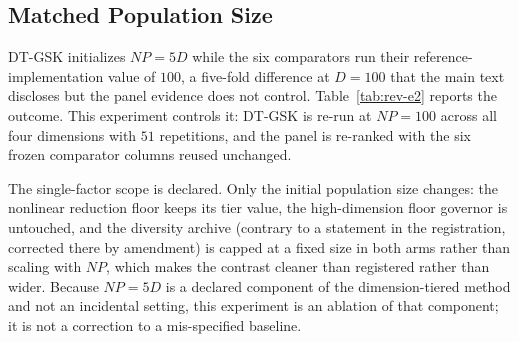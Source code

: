 \documentclass[algorithms,article,submit,moreauthors,pdftex]{Definitions/mdpi}
\newcommand{\dtgsk}{DT-GSK}
\begin{document}
\subsection{Matched Population Size}\label{sec:supp:rev:np}

\dtgsk{} initializes $NP = 5D$ while the six comparators run their
reference-implementation value of $100$, a five-fold difference at $D = 100$
that the main text discloses but the panel evidence does not control.
Table~\ref{tab:rev-e2} reports the outcome.  This experiment
controls it: \dtgsk{} is re-run at $NP = 100$ across all four dimensions with
$51$ repetitions, and the panel is re-ranked with the six frozen comparator
columns reused unchanged.

The single-factor scope is declared.  Only the initial population size changes:
the nonlinear reduction floor keeps its tier value, the high-dimension floor
governor is untouched, and the diversity archive (contrary to a statement in the
registration, corrected there by amendment) is capped at a fixed size in both
arms rather than scaling with $NP$, which makes the contrast cleaner than
registered rather than wider.  Because $NP = 5D$ is a declared component of the
dimension-tiered method and not an incidental setting, this experiment is an
ablation of that component; it is not a correction to a mis-specified baseline.

\begin{table}[H]
\caption{\dtgsk{} at the comparators' population value.  Mean ranks and ordinal
positions are computed over the seven-algorithm panel with only the \dtgsk{}
column substituted.  The paired test compares \dtgsk{} against itself across the
29 functions, Holm-corrected across the four dimensions; $A_{12}$ takes the
$NP = 5D$ arm as reference.}\label{tab:rev-e2}
\resizebox{\textwidth}{!}{}
\end{table}
\end{document}
